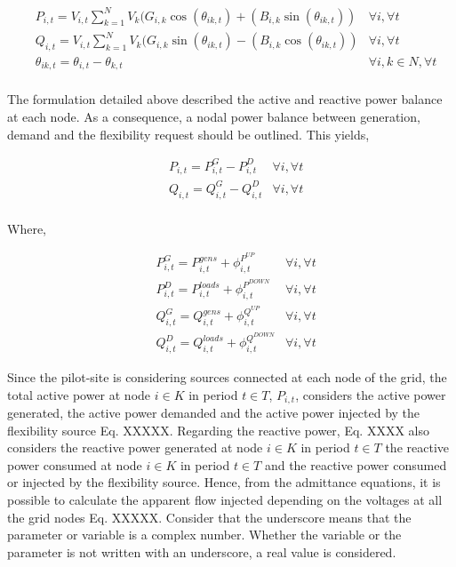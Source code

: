 \begin{subequations}
\begin{align*}
& P_{i,t} = V_{i,t} \sum_{k=1}^{N} V_{k} (G_{i,k} \cos(\theta_{ik,t}) + (B_{i,k} \sin(\theta_{ik,t})) & \forall i,\forall t  \\ 
& Q_{i,t} = V_{i,t} \sum_{k=1}^{N} V_{k} (G_{i,k} \sin(\theta_{ik,t}) - (B_{i,k} \cos(\theta_{ik,t})) & \forall i,\forall t \\
& \theta_{ik,t} = \theta_{i,t} - \theta_{k,t} 															& \forall i,k \in N, \forall t \\
\end{align*}
\end{subequations}

The formulation detailed above described the active and reactive power balance at each node. As a consequence, a nodal power balance between generation, demand and the flexibility request should be outlined. This yields, 

\begin{subequations}
\begin{align*}
& P_{i,t} = P_{i,t}^{G} - P_{i,t}^{D}   & \forall i,\forall t \\
& Q_{i,t} = Q_{i,t}^{G} - Q_{i,t}^{D}   & \forall i,\forall t \\
\end{align*}
\end{subequations}

Where, 

\begin{subequations}
\begin{align*}
& P_{i,t}^{G} = P_{i,t}^{gens} + \phi_{i,t}^{P^{UP}}    & \forall i,\forall t \\
& P_{i,t}^{D} = P_{i,t}^{loads} + \phi_{i,t}^{P^{DOWN}} & \forall i,\forall t \\
& Q_{i,t}^{G} = Q_{i,t}^{gens} + \phi_{i,t}^{Q^{UP}}    & \forall i,\forall t\\
& Q_{i,t}^{D} = Q_{i,t}^{loads} + \phi_{i,t}^{Q^{DOWN}} & \forall i,\forall t 
\end{align*}
\end{subequations}

Since the pilot-site is considering sources connected at each node of the grid, the total active power at node $i \in K$ in period $t \in T$, $P_{i,t}$, considers the active power generated, the active power demanded and the active power injected by the flexibility source Eq. XXXXX. Regarding the reactive power, Eq. XXXX also considers the reactive power generated at node  $i \in K$ in period $t \in T$ the reactive power consumed at node $i \in K$ in period $t \in T$ and the reactive power consumed or injected by the flexibility source.
Hence, from the admittance equations, it is possible to calculate the apparent flow injected depending on the voltages at all the grid nodes Eq. XXXXX. Consider that the underscore means that the parameter or variable is a complex number. Whether the variable or the parameter is not written with an underscore, a real value is considered.

